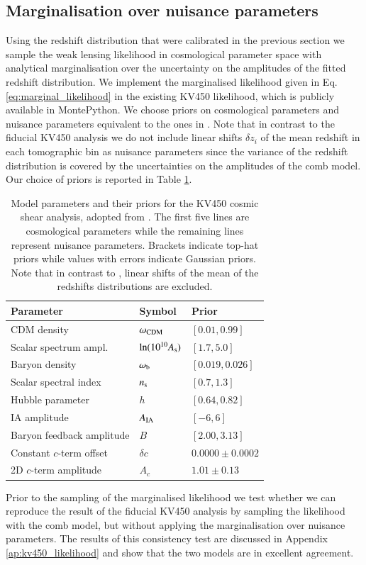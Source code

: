 \documentclass{aa}
\begin{document}
\subsection{Marginalisation over nuisance parameters} 
Using the redshift distribution that were calibrated in the previous section we sample the weak lensing likelihood in cosmological parameter space with analytical marginalisation over the uncertainty on the amplitudes of the fitted redshift distribution. We implement the marginalised likelihood given in Eq. \ref{eq:marginal_likelihood} in the existing KV450 likelihood, which is publicly available in {\sc MontePython}. We choose priors on cosmological parameters and nuisance parameters equivalent to the ones in \cite{hildebrandt18}. Note that in contrast to the fiducial KV450 analysis we do not include linear shifts $\delta z_i$ of the mean redshift in each tomographic bin as nuisance parameters since the variance of the redshift distribution is covered by the uncertainties on the amplitudes of the comb model. Our choice of priors is reported in Table \ref{tab:priors}.
\begin{table}
\label{tab:priors}
\begin{tabular}{lll}
\hline
Parameter & Symbol & Prior\\
\hline
CDM density & $\omega_{\rm CDM}$ & $[0.01, 0.99]$\\
Scalar spectrum ampl. & $\ln(10^{10}A_{\rm s})$ & $[1.7, 5.0]$\\
Baryon density & $\omega_{\rm b}$ & $[0.019, 0.026]$ \\
Scalar spectral index & $n_{\rm s}$ & $[0.7, 1.3]$ \\
Hubble parameter & $h$ & $[0.64, 0.82]$ \\
\hline
IA amplitude & $A_{\rm IA}$ & $[-6, 6]$\\
Baryon feedback amplitude & $B$ & $[2.00, 3.13]$\\
Constant $c$-term offset & $\delta c$ & $0.0000\pm0.0002$ \\
2D $c$-term amplitude & $A_c$ & $1.01\pm0.13$\\
\hline
\end{tabular}
\caption{Model parameters and their priors for the KV450 cosmic shear analysis, adopted from \cite{hildebrandt18}. The first five lines are cosmological parameters while the remaining lines represent nuisance parameters. Brackets indicate top-hat priors while values with errors indicate Gaussian priors. Note that in contrast to \cite{hildebrandt18}, linear shifts of the mean of the redshifts distributions are excluded.}
\end{table}
Prior to the sampling of the marginalised likelihood we test whether we can reproduce the result of the fiducial KV450 analysis by sampling the likelihood with the comb model, but without applying the marginalisation over nuisance parameters. The results of this consistency test are discussed in Appendix \ref{ap:kv450_likelihood} and show that the two models are in excellent agreement. 
\end{document}
